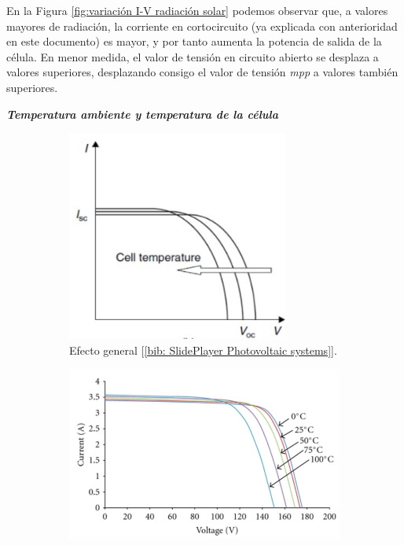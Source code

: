 \documentclass[12pt]{article}
\begin{document}
	\noindent En la Figura \ref{fig:variación I-V radiación solar} podemos observar que, a valores mayores de radiación, la corriente en cortocircuito (ya explicada con anterioridad en este documento) es mayor, y por tanto aumenta la potencia de salida de la célula. En menor medida, el valor de tensión en circuito abierto se desplaza a valores superiores, desplazando consigo el valor de tensión \textit{mpp} a valores también superiores. \\
	
	\pagebreak
	
	\noindent \textit{\textbf{Temperatura ambiente y temperatura de la célula}} \\
	
	\begin{figure}[h!]
		\begin{subfigure}{0.45\textwidth}
			\includegraphics[width=0.8\textwidth]{img/generalEffect_celTempIVcurve_solarCell.png} 
			\caption{Efecto general [\ref{bib: SlidePlayer Photovoltaic systems}].}
			\label{fig: variación general en la curva I-V de una célula PV con la temperatura.}
		\end{subfigure}
		\begin{subfigure}{0.55\textwidth}
			\includegraphics[width=1\linewidth]{img/concreteEffect_TempIVcurve_solarCell.png}

\end{subfigure}
\end{figure}
\end{document}
